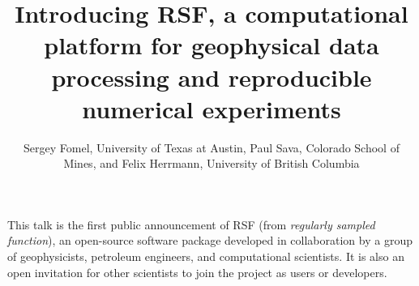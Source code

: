 \renewcommand{\thefootnote}{\fnsymbol{footnote}} 

\title{Introducing RSF, a computational platform for geophysical data processing and reproducible numerical experiments}

\author{Sergey Fomel\footnotemark[1], University of Texas at Austin, Paul Sava, Colorado School of Mines, and Felix Herrmann, University of British Columbia}

\maketitle

This talk is the first public announcement of RSF (from
\emph{regularly sampled function}), an open-source software package
developed in collaboration by a group of geophysicists, petroleum
engineers, and computational scientists. It is also an open invitation
for other scientists to join the project as users or developers.


